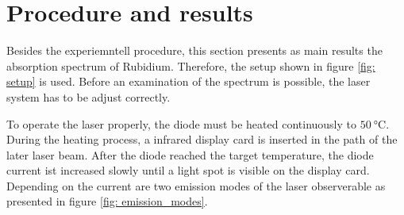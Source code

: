 \section{Procedure and results}
Besides the experiemntell procedure, this section presents as main results the
absorption spectrum of Rubidium. Therefore, the setup shown in figure \ref{fig: setup}
is used. Before an examination of the spectrum is possible, the laser system has to be
adjust correctly.

To operate the laser properly, the diode must be heated
continuously to $\SI{50}{\degreeCelsius}$. During the heating process, a infrared display
card is inserted in the path of the later laser beam. After the diode reached
the target temperature, the diode current ist increased slowly until a
light spot is visible on the display card. Depending on the current are
two emission modes of the laser observerable as presented in figure \ref{fig: emission_modes}.
